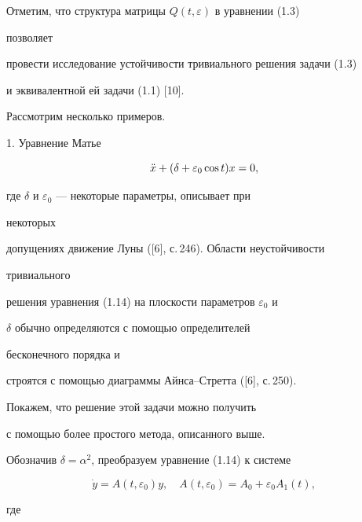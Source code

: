  


\begin{notes} 


Отметим, что структура матрицы $Q(t,\varepsilon)$ в уравнении (1.3) 


позволяет 


провести исследование устойчивости тривиального решения задачи (1.3) 


и эквивалентной ей задачи (1.1) [10]. 


\end{notes} 


 


Рассмотрим несколько примеров.  


 


1. Уравнение Матье 


\begin{equation} 


\Ddot x+(\delta+\varepsilon_0\cos t)x=0, 


\end{equation} 


где $\delta$ и $\varepsilon_0$ --- некоторые параметры, описывает при 


некоторых 


допущениях движение Луны ([6], с.\,246). Области неустойчивости 


тривиального  


решения уравнения (1.14) на плоскости параметров $\varepsilon_0$ и 


$\delta$ обычно определяются с помощью определителей


бесконечного порядка и


строятся с помощью диаграммы Айнса--Стретта ([6], с.\,250). 


Покажем, что решение этой задачи можно получить 


с помощью более простого метода, описанного выше. 


Обозначив $\delta=\alpha^2$, преобразуем уравнение (1.14) к системе 


\begin{equation} 


\Dot y=A(t,\varepsilon_0)y,\quad A(t,\varepsilon_0)=A_0+ 


\varepsilon_0A_1(t), 


\end{equation} 


где 


$$ 


